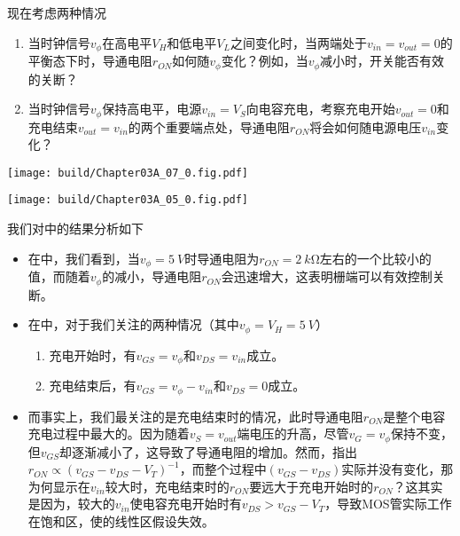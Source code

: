 现在考虑两种情况
\begin{enumerate}
    \item 当时钟信号$v_{\phi}$在高电平$V_H$和低电平$V_L$之间变化时，当两端处于$v_{in}=v_{out}=0$的平衡态下时，导通电阻$r_{ON}$如何随$v_{\phi}$变化？例如，当$v_{\phi}$减小时，开关能否有效的关断？
    \item 当时钟信号$v_{\phi}$保持高电平，电源$v_{in}=V_S$向电容充电，考察充电开始$v_{out}=0$和充电结束$v_{out}=v_{in}$的两个重要端点处，导通电阻$r_{ON}$将会如何随电源电压$v_{in}$变化？
\end{enumerate}

\begin{Figure}[MOS开关的导通电阻]
    \begin{FigureSub}[随时钟变化]
        \texttt{[image: build/Chapter03A\_07\_0.fig.pdf]}
    \end{FigureSub}
    \begin{FigureSub}[随电源变化]
        \texttt{[image: build/Chapter03A\_05\_0.fig.pdf]}
    \end{FigureSub}
\end{Figure}

我们对中的结果分析如下
\begin{itemize}
    \item 在中，我们看到，当$v_{\phi}=\SI{5}{V}$时导通电阻为$r_{ON}=\SI{2}{k\ohm}$左右的一个比较小的值，而随着$v_{\phi}$的减小，导通电阻$r_{ON}$会迅速增大，这表明栅端可以有效控制关断。
    \item 在中，对于我们关注的两种情况（其中$v_{\phi}=V_H=\SI{5}{V}$）
    \begin{enumerate}
        \item 充电开始时，有$v_{GS}=v_{\phi}$和$v_{DS}=v_{in}$成立。
        \item 充电结束后，有$v_{GS}=v_{\phi}-v_{in}$和$v_{DS}=0$成立。
    \end{enumerate}
    \item 而事实上，我们最关注的是充电结束时的情况，此时导通电阻$r_{ON}$是整个电容充电过程中最大的。因为随着$v_S=v_{out}$端电压的升高，尽管$v_G=v_{\phi}$保持不变，但$v_{GS}$却逐渐减小了，这导致了导通电阻的增加。然而，指出$r_{ON}\propto (v_{GS}-v_{DS}-V_T)^{-1}$，而整个过程中$(v_{GS}-v_{DS})$实际并没有变化，那为何显示在$v_{in}$较大时，充电结束时的$r_{ON}$要远大于充电开始时的$r_{ON}$？这其实是因为，较大的$v_{in}$使电容充电开始时有$v_{DS}>v_{GS}-V_T$，导致MOS管实际工作在饱和区，使的线性区假设失效。
\end{itemize}

